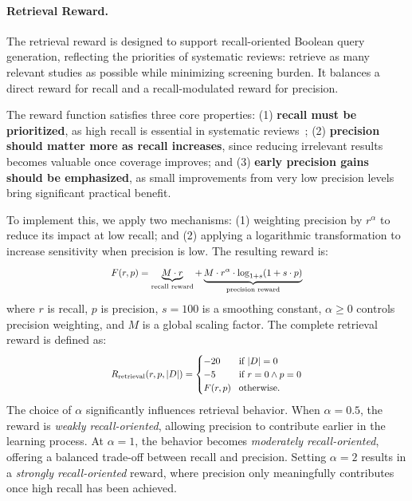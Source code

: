 \paragraph{Retrieval Reward.}
The retrieval reward is designed to support recall-oriented Boolean query generation, reflecting the priorities of systematic reviews: retrieve as many relevant studies as possible while minimizing screening burden. It balances a direct reward for recall and a recall-modulated reward for precision.

The reward function satisfies three core properties: 
(1) \textbf{recall must be prioritized}, as high recall is essential in systematic reviews~\cite{straube2021recall};
(2) \textbf{precision should matter more as recall increases}, since reducing irrelevant results becomes valuable once coverage improves; and 
(3) \textbf{early precision gains should be emphasized}, as small improvements from very low precision levels bring significant practical benefit.

To implement this, we apply two mechanisms: 
(1) weighting precision by \( r^\alpha \) to reduce its impact at low recall; and 
(2) applying a logarithmic transformation to increase sensitivity when precision is low. The resulting reward is:
\begin{equation}\label{eq:reward_function}
	\resizebox{0.5\columnwidth}{!}{$\displaystyle
		F(r, p) = \underbrace{M \cdot r}_{\text{recall reward}} + \underbrace{M \cdot r^\alpha \cdot \log_{1 + s}(1 + s \cdot p)}_{\text{precision reward}}
		$}
\end{equation}
where \( r \) is recall, \( p \) is precision, \( s = 100 \) is a smoothing constant, \( \alpha \geq 0 \) controls precision weighting, and \( M \) is a global scaling factor.
%
The complete retrieval reward is defined as:
\begin{equation}\label{eq:retrieval_reward}
	\resizebox{0.5\columnwidth}{!}{$\displaystyle
		R_{\text{retrieval}}(r, p, |D|) =
		\begin{cases}
			-20 &\!\text{if } |D| = 0 \\
			-5 &\!\text{if } r = 0 \land p = 0 \\
			F(r, p) &\!\text{otherwise.}
		\end{cases}
		$}
\end{equation}
The choice of \( \alpha \) significantly influences retrieval behavior. When \( \alpha = 0.5 \), the reward is \textit{weakly recall-oriented}, allowing precision to contribute earlier in the learning process. At \( \alpha = 1 \), the behavior becomes \textit{moderately recall-oriented}, offering a balanced trade-off between recall and precision. Setting \( \alpha = 2 \) results in a \textit{strongly recall-oriented} reward, where precision only meaningfully contributes once high recall has been achieved.

